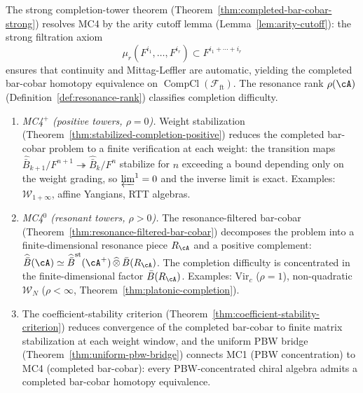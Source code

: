 \begin{construction}
\label{constr:completion-mc4}
The strong completion-tower theorem
(Theorem~\ref{thm:completed-bar-cobar-strong}) resolves MC4
by the arity cutoff lemma
(Lemma~\ref{lem:arity-cutoff}): the strong filtration axiom
\[
\mu_r(F^{i_1}, \ldots, F^{i_r})
\subset F^{i_1 + \cdots + i_r}
\]
ensures that continuity and Mittag-Leffler are automatic,
yielding the completed bar-cobar homotopy equivalence on
$\operatorname{CompCl}(\mathcal{F}_{\mathrm{ft}})$.  The
resonance rank $\rho(\cA)$
(Definition~\ref{def:resonance-rank}) classifies completion
difficulty.
\begin{enumerate}[label=\textup{(\roman*)}]
\item \emph{MC4$^+$ (positive towers, $\rho = 0$).}
  Weight stabilization
  (Theorem~\ref{thm:stabilized-completion-positive})
  reduces the completed bar-cobar problem to a finite
  verification at each weight: the transition maps
  $\widehat{\bar B}_{k+1}/F^{n+1}
  \twoheadrightarrow
  \widehat{\bar B}_k/F^n$
  stabilize for $n$ exceeding a bound depending only on
  the weight grading, so
  $\varprojlim^1 = 0$ and the inverse limit is exact.
  Examples: $\mathcal{W}_{1+\infty}$, affine Yangians,
  RTT algebras.
\item \emph{MC4$^0$ (resonant towers, $\rho > 0$).}
  The resonance-filtered bar-cobar
  (Theorem~\ref{thm:resonance-filtered-bar-cobar})
  decomposes the problem into a finite-dimensional
  resonance piece $R_\cA$ and a positive complement:
  $\widehat{\bar B}(\cA)
  \simeq
  \widehat{\bar B}^{\mathrm{st}}(\cA^+)
  \,\widehat{\otimes}\,
  \bar B(R_\cA)$.
  The completion difficulty is concentrated in the
  finite-dimensional factor $\bar B(R_\cA)$.
  Examples: $\mathrm{Vir}_c$ ($\rho = 1$),
  non-quadratic $\mathcal{W}_N$ ($\rho < \infty$,
  Theorem~\ref{thm:platonic-completion}).
\item The coefficient-stability criterion
  (Theorem~\ref{thm:coefficient-stability-criterion})
  reduces convergence of the completed bar-cobar to
  finite matrix stabilization at each weight window,
  and the uniform PBW bridge
  (Theorem~\ref{thm:uniform-pbw-bridge}) connects
  MC1 (PBW concentration) to MC4 (completed
  bar-cobar): every PBW-concentrated chiral algebra
  admits a completed bar-cobar homotopy equivalence.
\end{enumerate}
\end{construction}

